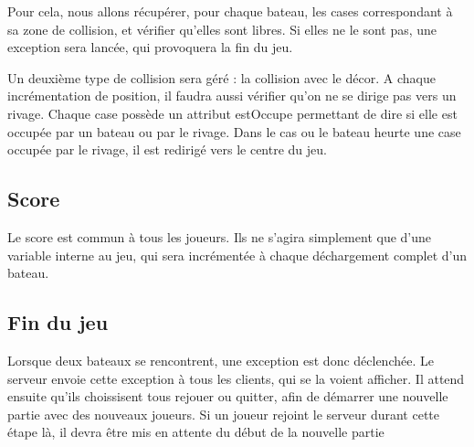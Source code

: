 Pour cela, nous allons récupérer, pour chaque bateau, les cases correspondant à sa zone de collision, et vérifier qu'elles sont libres. Si elles ne le sont pas, une exception sera lancée, qui provoquera la fin du jeu. 

Un deuxième type de collision sera géré : la collision avec le décor. A chaque incrémentation de position, il faudra aussi vérifier qu'on ne se dirige pas vers un rivage. Chaque case possède un attribut estOccupe permettant de dire si elle est occupée par un bateau ou par le rivage. Dans le cas ou le bateau heurte une case occupée par le rivage, il est redirigé vers le centre du jeu. 
\subsection{Score}

Le score est commun à tous les joueurs. Ils ne s'agira simplement que d'une variable interne au jeu, qui sera incrémentée à chaque déchargement complet d'un bateau. 

\subsection{Fin du jeu}

Lorsque deux bateaux se rencontrent, une exception est donc déclenchée. Le serveur envoie cette exception à tous les clients, qui se la voient afficher. Il attend ensuite qu'ils choissisent tous rejouer ou quitter, afin de démarrer une nouvelle partie avec des nouveaux joueurs. Si un joueur rejoint le serveur durant cette étape là, il devra être mis en attente du début de la nouvelle partie